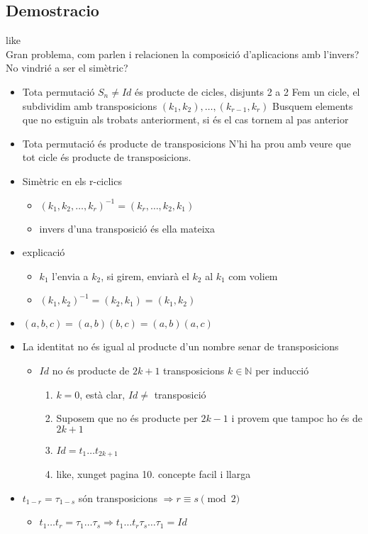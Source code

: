 \documentclass{article}
\newcommand{\N}{\mathbb{N}}
\begin{document}
\subsection{Demostracio}
like\\
Gran problema, com parlen i relacionen la composició d'aplicacions amb l'invers? No vindrié a ser el simètric?
\begin{itemize}
\item Tota permutació $S_n \neq Id$ és producte de cicles, disjunts 2 a 2
	\subitem Fem un cicle, el subdividim amb transposicions $(k_1, k_2), \dots, (k_{r-1}, k_r)$
	\subitem Busquem elements que no estiguin als trobats anteriorment, si és el cas tornem al pas anterior
\item Tota permutació és producte de transposicions
	\subitem N'hi ha prou amb veure que tot cicle és producte de transposicions.
\item Simètric en els r-ciclics
	\begin{itemize}
	\item $(k_1, k_2, \dots, k_r)^{-1} = (k_r, \dots, k_2, k_1)$
	\item invers d'una transposició és ella mateixa
	\end{itemize}
\item explicació
	\begin{itemize}
	\item $k_1$ l'envia a $k_2$, si girem, enviarà el $k_2$ al $k_1$ com voliem
	\item $(k_1, k_2)^{-1} = (k_2, k_1) = (k_1, k_2)$
	\end{itemize}
\item $(a, b, c) = (a, b)(b, c) = (a, b)(a, c)$
\item La identitat no és igual al producte d'un nombre senar de transposicions
	\begin{itemize}
	\item $Id$ no és producte de $2k +1$ transposicions $k \in \N$ per inducció
		\begin{enumerate}
		\item $k = 0$, està clar, $Id \neq$ transposició
		\item Suposem que no és producte per $2k -1$ i provem que tampoc ho és de $2k +1$
		\item $Id = t_1\dots t_{2k+1}$
		\item like, xunget pagina 10. concepte facil i llarga
		\end{enumerate}
	\end{itemize}
\item $t_{1-r} = \tau_{1-s}$ són transposicions
	\subitem $\Rightarrow r \equiv s \pmod{2}$
	\begin{itemize}
	\item $t_1\dots t_r = \tau_1\dots \tau_s \Rightarrow t_1\dots t_r \tau_s \dots \tau_1 = Id$
	\end{itemize}
\end{itemize}
\end{document}
